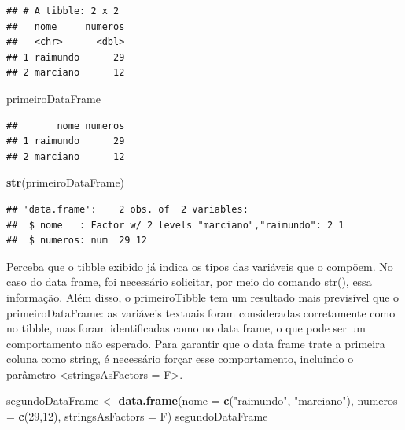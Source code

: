 \documentclass[
]{book}
\newenvironment{Shaded}{\begin{snugshade}}{\end{snugshade}}
\newcommand{\DataTypeTok}[1]{\textcolor[rgb]{0.13,0.29,0.53}{#1}}
\newcommand{\DecValTok}[1]{\textcolor[rgb]{0.00,0.00,0.81}{#1}}
\newcommand{\KeywordTok}[1]{\textcolor[rgb]{0.13,0.29,0.53}{\textbf{#1}}}
\newcommand{\NormalTok}[1]{#1}
\newcommand{\StringTok}[1]{\textcolor[rgb]{0.31,0.60,0.02}{#1}}
\begin{document}
\begin{verbatim}
## # A tibble: 2 x 2
##   nome     numeros
##   <chr>      <dbl>
## 1 raimundo      29
## 2 marciano      12
\end{verbatim}

\begin{Shaded}
\begin{Highlighting}[]
\NormalTok{primeiroDataFrame}
\end{Highlighting}
\end{Shaded}

\begin{verbatim}
##       nome numeros
## 1 raimundo      29
## 2 marciano      12
\end{verbatim}

\begin{Shaded}
\begin{Highlighting}[]
\KeywordTok{str}\NormalTok{(primeiroDataFrame)}
\end{Highlighting}
\end{Shaded}

\begin{verbatim}
## 'data.frame':    2 obs. of  2 variables:
##  $ nome   : Factor w/ 2 levels "marciano","raimundo": 2 1
##  $ numeros: num  29 12
\end{verbatim}

Perceba que o tibble exibido já indica os tipos das variáveis que o compõem. No caso do data frame, foi necessário solicitar, por meio do comando str(), essa informação. Além disso, o primeiroTibble tem um resultado mais previsível que o primeiroDataFrame: as variáveis textuais foram consideradas corretamente como no tibble, mas foram identificadas como no data frame, o que pode ser um comportamento não esperado. Para garantir que o data frame trate a primeira coluna como string, é necessário forçar esse comportamento, incluindo o parâmetro \textless stringsAsFactors = F\textgreater.

\begin{Shaded}
\begin{Highlighting}[]
\NormalTok{segundoDataFrame <-}\StringTok{ }\KeywordTok{data.frame}\NormalTok{(}\DataTypeTok{nome =} \KeywordTok{c}\NormalTok{(}\StringTok{"raimundo"}\NormalTok{, }\StringTok{"marciano"}\NormalTok{), }
                      \DataTypeTok{numeros =} \KeywordTok{c}\NormalTok{(}\DecValTok{29}\NormalTok{,}\DecValTok{12}\NormalTok{), }\DataTypeTok{stringsAsFactors =}\NormalTok{ F)}
\NormalTok{segundoDataFrame}
\end{Highlighting}
\end{Shaded}
\end{document}

